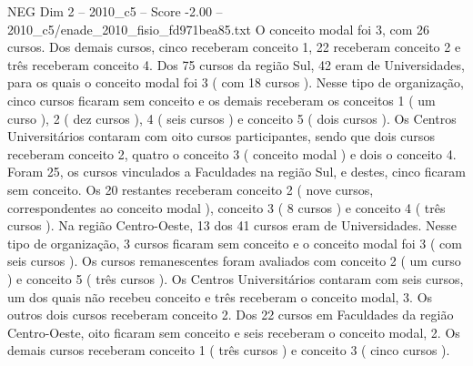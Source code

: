 \begin{textsample}{NEG Dim 2 – 2010\_c5 – Score -2.00 – 2010\_c5/enade\_2010\_fisio\_fd971bea85.txt}
O conceito modal foi 3, com 26 cursos.
Dos demais cursos, cinco receberam conceito 1, 22 receberam conceito 2 e três receberam conceito 4.
Dos 75 cursos da região Sul, 42 eram de Universidades, para os quais o conceito modal foi 3 ( com 18 cursos ).
Nesse tipo de organização, cinco cursos ficaram sem conceito e os demais receberam os conceitos 1 ( um curso ), 2 ( dez cursos ), 4 ( seis cursos ) e conceito 5 ( dois cursos ).
Os Centros Universitários contaram com oito cursos participantes, sendo que dois cursos receberam conceito 2, quatro o conceito 3 ( conceito modal ) e dois o conceito 4.
Foram 25, os cursos vinculados a Faculdades na região Sul, e destes, cinco ficaram sem conceito.
Os 20 restantes receberam conceito 2 ( nove cursos, correspondentes ao conceito modal ), conceito 3 ( 8 cursos ) e conceito 4 ( três cursos ).
Na região Centro-Oeste, 13 dos 41 cursos eram de Universidades.
Nesse tipo de organização, 3 cursos ficaram sem conceito e o conceito modal foi 3 ( com seis cursos ).
Os cursos remanescentes foram avaliados com conceito 2 ( um curso ) e conceito 5 ( três cursos ).
Os Centros Universitários contaram com seis cursos, um dos quais não recebeu conceito e três receberam o conceito modal, 3.
Os outros dois cursos receberam conceito 2.
Dos 22 cursos em Faculdades da região Centro-Oeste, oito ficaram sem conceito e seis receberam o conceito modal, 2.
Os demais cursos receberam conceito 1 ( três cursos ) e conceito 3 ( cinco cursos ).

\end{textsample}
